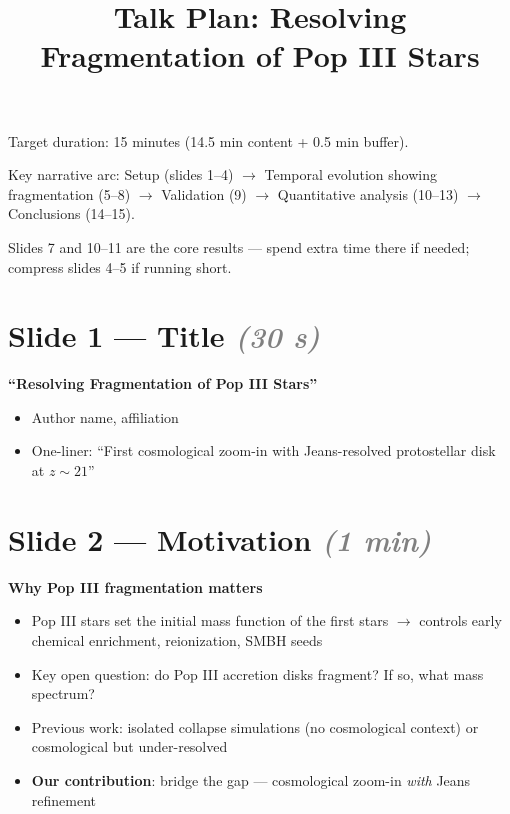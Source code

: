 \documentclass[12pt]{article}
\title{Talk Plan: Resolving Fragmentation of Pop III Stars}
\author{}
\date{}
\newcommand{\timing}[1]{\textcolor{gray}{\textit{(#1)}}}
\begin{document}
\maketitle

Target duration: 15 minutes (14.5 min content + 0.5 min buffer).

Key narrative arc: Setup (slides 1--4) $\to$ Temporal evolution showing
fragmentation (5--8) $\to$ Validation (9) $\to$ Quantitative analysis
(10--13) $\to$ Conclusions (14--15).

Slides 7 and 10--11 are the core results --- spend extra time there if
needed; compress slides 4--5 if running short.

\section*{Slide 1 --- Title \timing{30 s}}

\textbf{``Resolving Fragmentation of Pop III Stars''}

\begin{itemize}
  \item Author name, affiliation
  \item One-liner: ``First cosmological zoom-in with Jeans-resolved
        protostellar disk at $z \sim 21$''
\end{itemize}

\section*{Slide 2 --- Motivation \timing{1 min}}

\textbf{Why Pop III fragmentation matters}

\begin{itemize}
  \item Pop III stars set the initial mass function of the first stars
        $\to$ controls early chemical enrichment, reionization, SMBH seeds
  \item Key open question: do Pop III accretion disks fragment?
        If so, what mass spectrum?
  \item Previous work: isolated collapse simulations (no cosmological
        context) or cosmological but under-resolved
  \item \textbf{Our contribution}: bridge the gap --- cosmological zoom-in
        \emph{with} Jeans refinement
\end{itemize}
\end{document}
